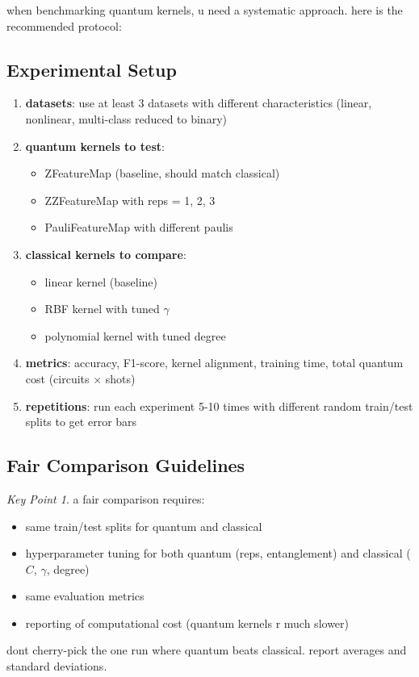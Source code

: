 \documentclass[11pt,a4paper]{article}
\theoremstyle{definition}
\theoremstyle{remark}
\newtheorem*{keypoint}{Key Point}
\begin{document}
when benchmarking quantum kernels, u need a systematic approach. here is the recommended protocol:

\subsection{Experimental Setup}

\begin{enumerate}[leftmargin=*]
    \item \textbf{datasets}: use at least 3 datasets with different characteristics (linear, nonlinear, multi-class reduced to binary)

    \item \textbf{quantum kernels to test}:
    \begin{itemize}[leftmargin=*]
        \item ZFeatureMap (baseline, should match classical)
        \item ZZFeatureMap with reps = 1, 2, 3
        \item PauliFeatureMap with different paulis
    \end{itemize}

    \item \textbf{classical kernels to compare}:
    \begin{itemize}[leftmargin=*]
        \item linear kernel (baseline)
        \item RBF kernel with tuned $\gamma$
        \item polynomial kernel with tuned degree
    \end{itemize}

    \item \textbf{metrics}: accuracy, F1-score, kernel alignment, training time, total quantum cost (circuits $\times$ shots)

    \item \textbf{repetitions}: run each experiment 5-10 times with different random train/test splits to get error bars
\end{enumerate}

\subsection{Fair Comparison Guidelines}

\begin{keypoint}
a fair comparison requires:
\begin{itemize}[leftmargin=*]
    \item same train/test splits for quantum and classical
    \item hyperparameter tuning for both quantum (reps, entanglement) and classical ($C$, $\gamma$, degree)
    \item same evaluation metrics
    \item reporting of computational cost (quantum kernels r much slower)
\end{itemize}
dont cherry-pick the one run where quantum beats classical. report averages and standard deviations.
\end{keypoint}
\end{document}
